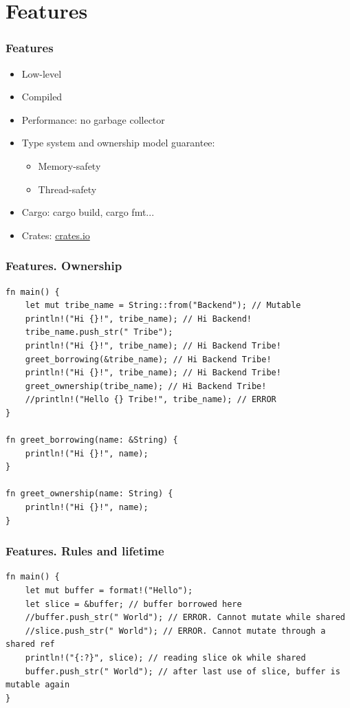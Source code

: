 \documentclass{beamer}
\begin{document}
\section{Features}

\begin{frame}
\frametitle{Features}

\begin{itemize}
\item Low-level
\item Compiled
\item Performance: no garbage collector
\item Type system and ownership model guarantee:
  \begin{itemize}
  \item Memory-safety
  \item Thread-safety
  \end{itemize}
\item Cargo: cargo build, cargo fmt...
\item Crates: \href{https://crates.io/}{crates.io}
\end{itemize}

\end{frame}

\begin{frame}[fragile]
\frametitle{Features. Ownership}

\begin{lstlisting}
fn main() {
    let mut tribe_name = String::from("Backend"); // Mutable
    println!("Hi {}!", tribe_name); // Hi Backend!
    tribe_name.push_str(" Tribe");
    println!("Hi {}!", tribe_name); // Hi Backend Tribe!
    greet_borrowing(&tribe_name); // Hi Backend Tribe!
    println!("Hi {}!", tribe_name); // Hi Backend Tribe!
    greet_ownership(tribe_name); // Hi Backend Tribe!
    //println!("Hello {} Tribe!", tribe_name); // ERROR
}

fn greet_borrowing(name: &String) {
    println!("Hi {}!", name);
}

fn greet_ownership(name: String) {
    println!("Hi {}!", name);
}
\end{lstlisting}

\end{frame}

\begin{frame}[fragile]
\frametitle{Features. Rules and lifetime}

\begin{lstlisting}
fn main() {
    let mut buffer = format!("Hello");
    let slice = &buffer; // buffer borrowed here
    //buffer.push_str(" World"); // ERROR. Cannot mutate while shared
    //slice.push_str(" World"); // ERROR. Cannot mutate through a shared ref
    println!("{:?}", slice); // reading slice ok while shared
    buffer.push_str(" World"); // after last use of slice, buffer is mutable again
}
\end{lstlisting}

\end{frame}
\end{document}
